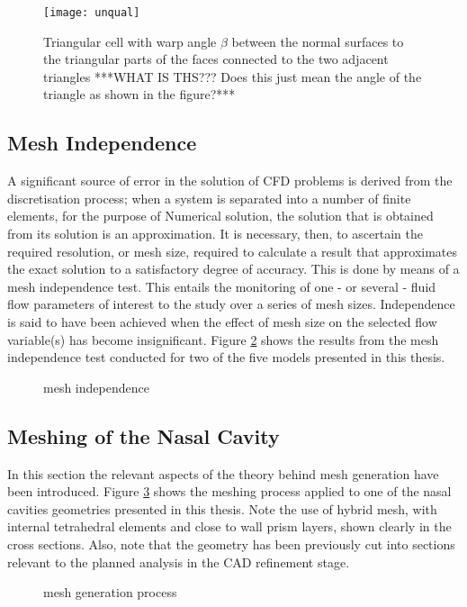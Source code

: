\begin{figure}
  \texttt{[image: unqual]}
  \caption{Triangular cell with warp angle $\beta$ between the normal surfaces to the triangular parts of the faces connected to the two adjacent triangles ***WHAT IS THS??? Does this just mean the angle of the triangle as shown in the figure?*** } \label{fig:unqual}
\end{figure}

\subsection{Mesh Independence}

A significant source of error in the solution of CFD problems is derived from the discretisation process; when a system is separated into a number of finite elements, for the purpose of Numerical solution, the solution that is obtained from its solution is an approximation. It is necessary, then, to ascertain the required resolution, or mesh size, required to calculate a result that approximates the exact solution to a satisfactory degree of accuracy. This is done by means of a mesh independence test. This entails the monitoring of one - or several - fluid flow parameters of interest to the study over a series of mesh sizes. Independence is said to have been achieved when the effect of mesh size on the selected flow variable(s) has become insignificant. Figure \ref{fig:mind} shows the results from the mesh independence test conducted for two of the five models presented in this thesis.

\begin{figure}

  \caption{mesh independence} \label{fig:mind}

\end{figure}
\subsection{Meshing of the Nasal Cavity}

In this section the relevant aspects of the theory behind mesh generation have been introduced. Figure \ref{fig:cavme} shows the meshing process applied to one of the nasal cavities geometries presented in this thesis. Note the use of hybrid mesh, with internal tetrahedral elements and close to wall prism layers, shown clearly in the cross sections. Also, note that the geometry has been previously cut into sections relevant to the planned analysis in the CAD refinement stage.

\begin{figure}
  \caption{mesh generation process} \label{fig:cavme}
\end{figure}
